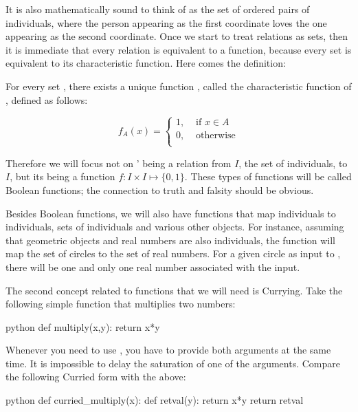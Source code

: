 \documentclass[11pt,a4paper]{article}
\begin{document}
It is also mathematically sound to think of  as the set of ordered pairs of individuals, where the person appearing as the first coordinate loves the one appearing as the second coordinate. Once we start to treat relations as sets, then it is immediate that every relation is equivalent to a function, because every set is equivalent to its characteristic function. Here comes the definition:

\begin{udefinition}
For every set , there exists a unique function , called the characteristic function of , defined as follows:

$$
f_A(x) =
\begin{cases}
1, & \text{ if } x \in A \\
0, & \text{ otherwise} \\
\end{cases}
$$
\end{udefinition}


Therefore we will focus not on ' being a relation from $I$, the set of individuals, to  $I$, but its being a function $f:I\times I\mapsto \{0,1\}$. These types of functions will be called Boolean functions; the connection to truth and falsity should be obvious.

Besides Boolean functions, we will also have functions that map individuals to individuals, sets of individuals and various other objects. For instance, assuming that geometric objects and real numbers are also individuals, the function  will map the set of circles to the set of real numbers. For a given circle as input to , there will be one and only one real number associated with the input.


The second concept related to functions that we will need is Currying. Take the following simple function that multiplies two numbers:

\begin{pygments}[frame=single]{python}
def multiply(x,y):
	return x*y
\end{pygments}

Whenever you need to use , you have to provide both arguments at the same time. It is impossible to delay the saturation of one of the arguments. Compare the following Curried form with the above: 

\begin{pygments}[frame=single]{python}
def curried_multiply(x):
	def retval(y):
		return x*y
	return retval 
\end{pygments}
\end{document}
